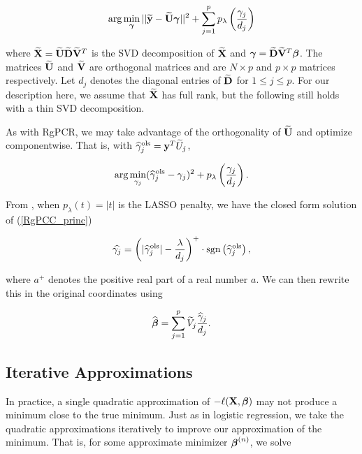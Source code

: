 \documentclass[main.tex]{subfiles}
\begin{document}
\begin{align}
	\text{arg} \min_{\boldsymbol \gamma} ||\widetilde{\mathbf{y}} - \widetilde{\mathbf{U}} \boldsymbol \gamma ||^2 + \sum_{j = 1}^p p_{\lambda} \left (\frac{\gamma_j}{d_j} \right )
\end{align}

where $\widetilde{\mathbf{X}} = \widetilde{\mathbf{U}} \widetilde{\mathbf{D}} \widetilde{\mathbf{V}}^T$ is the SVD decomposition of $\widetilde{\mathbf{X}}$ and $\boldsymbol \gamma = \widetilde{\mathbf{D}} \widetilde{\mathbf{V}}^T \boldsymbol \beta$. The matrices $\widetilde{\mathbf{U}}$ and $\widetilde{\mathbf{V}}$ are orthogonal matrices and are $N \times p$ and $p \times p$ matrices respectively. Let $d_j$ denotes the diagonal entries of $\widetilde{\mathbf{D}}$ for $1 \leq j \leq p$. For our description here, we assume that $\widetilde{\mathbf{X}}$ has full rank, but the following still holds with a thin SVD decomposition.

As with RgPCR, we may take advantage of the orthogonality of $\widetilde{\mathbf{U}}$ and optimize componentwise. That is, with $\widehat{\gamma}^{\text{ols}}_j = \mathbf{y}^T \widetilde{U}_j$,

\begin{align}
	 \text{arg} \min_{\gamma_j} (\widehat{\gamma}_j^{\text{ols}} - \gamma_j)^2 + p_{\lambda} \left (\frac{\gamma_j}{d_j} \right ). \label{RgPCC_princ}
\end{align}

From \cite{langzou}, when $p_\lambda(t) = |t|$ is the LASSO penalty, we have the closed form solution of (\ref{RgPCC_princ})

\begin{align}
	\widehat{\gamma_j} = \left ( |\widehat{\gamma}^{\text{ols}}_j| - \frac{\lambda}{d_j} \right )^+ \cdot \text{sgn} \left ( \widehat{\gamma}^{\text{ols}}_j \right ),
\end{align}

where $a^+$ denotes the positive real part of a real number $a$. We can then rewrite this in the original coordinates using

\begin{align}
	\widehat{\boldsymbol \beta} = \sum_{j = 1}^p \widetilde{V}_j \frac{\widehat{\gamma}_j}{d_j}.
\end{align}

\subsection{Iterative Approximations}

In practice, a single quadratic approximation of $- \ell(\mathbf{X}, \boldsymbol \beta)$ may not produce a minimum close to the true minimum. Just as in logistic regression, we take the quadratic approximations iteratively to improve our approximation of the minimum. That is, for some approximate minimizer $\boldsymbol \beta^{(n)}$, we solve
\end{document}
